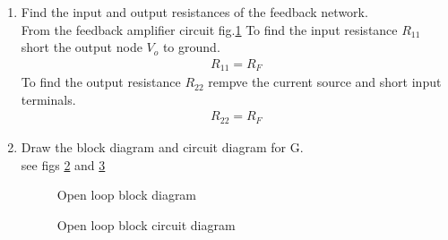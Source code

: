 \begin{enumerate}[label=\thesection.\arabic*.,ref=\thesection.\theenumi]
%
%
\begin{figure}[ht!]
	\begin{center}
		\resizebox{\columnwidth}{!}{}
	\end{center}
	\caption{Feedback circuit}
	\label{fig:ee18btech11046_fc}
\end{figure}
\renewcommand{\thefigure}{\theenumi}
%

From KVl on \ref{fig:ee18btech11046_fc} we can see that
\begin{align}
H=\frac{I_{F}}{V_{o}} = -\frac{1}{R_{F}}
\end{align}

\item Find the input and output resistances of the feedback network.\\
\solution
From the feedback amplifier circuit fig.\ref{fig:ee18btech11046_fc}
To find the input resistance $R_{11}$ short
the output node $V_{o}$ to ground.
\begin{align}
R_{11} = R_{F}
\end{align}
To find the output resistance $R_{22}$ rempve the current source and short input terminals.
\begin{align}
R_{22} = R_{F}
\end{align}

\item Draw the block diagram and circuit diagram for G.
\\
\solution see figs \ref{fig:ee18btech11046_Gblock} and \ref{fig:ee18btech11046_Gcir}
%
\renewcommand{\thefigure}{\theenumi.\arabic{figure}}

\begin{figure}[ht!]
	\begin{center}
		\resizebox{\columnwidth}{!}{}
	\end{center}
	\caption{Open loop block diagram}
	\label{fig:ee18btech11046_Gblock}
\end{figure}

%
\begin{figure}[ht!]
	\begin{center}
		\resizebox{\columnwidth}{!}{}
	\end{center}
	\caption{Open loop block circuit diagram}
	\label{fig:ee18btech11046_Gcir}
\end{figure}


\end{enumerate}
